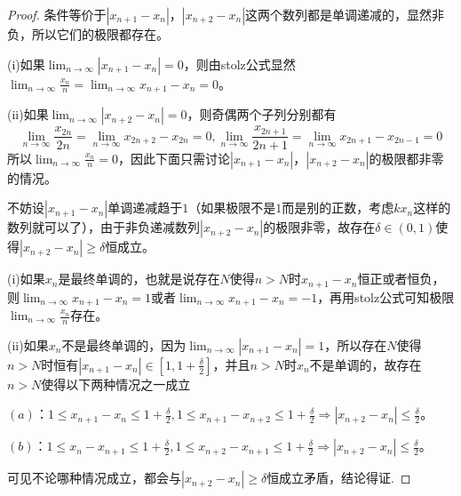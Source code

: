 \documentclass[../../main.tex]{subfiles}%
\begin{document}
\begin{proof}
条件等价于\(|x_{n + 1}-x_n|\)，\(|x_{n + 2}-x_n|\)这两个数列都是单调递减的，显然非负，所以它们的极限都存在。

(i)如果\(\lim_{n\rightarrow\infty}|x_{n + 1}-x_n| = 0\)，则由stolz公式显然\(\lim_{n\rightarrow\infty}\frac{x_n}{n}=\lim_{n\rightarrow\infty}x_{n + 1}-x_n = 0\)。

(ii)如果\(\lim_{n\rightarrow\infty}|x_{n + 2}-x_n| = 0\)，则奇偶两个子列分别都有
\[
\lim_{n\rightarrow\infty}\frac{x_{2n}}{2n}=\lim_{n\rightarrow\infty}x_{2n + 2}-x_{2n}=0, 
\lim_{n\rightarrow\infty}\frac{x_{2n + 1}}{2n + 1}=\lim_{n\rightarrow\infty}x_{2n + 1}-x_{2n - 1}=0
\]
所以\(\lim_{n\rightarrow\infty}\frac{x_n}{n}=0\)，因此下面只需讨论\(|x_{n + 1}-x_n|\)，\(|x_{n + 2}-x_n|\)的极限都非零的情况。

不妨设\(|x_{n + 1}-x_n|\)单调递减趋于\(1\)（如果极限不是\(1\)而是别的正数，考虑\(kx_n\)这样的数列就可以了），由于非负递减数列\(|x_{n + 2}-x_n|\)的极限非零，故存在\(\delta\in(0,1)\)使得\(|x_{n + 2}-x_n|\geqslant \delta\)恒成立。

(i)如果\(x_n\)是最终单调的，也就是说存在\(N\)使得\(n > N\)时\(x_{n + 1}-x_n\)恒正或者恒负，则\(\lim_{n\rightarrow\infty}x_{n + 1}-x_n = 1\)或者\(\lim_{n\rightarrow\infty}x_{n + 1}-x_n=-1\)，再用stolz公式可知极限\(\lim_{n\rightarrow\infty}\frac{x_n}{n}\)存在。

(ii)如果\(x_n\)不是最终单调的，因为\(\lim_{n\rightarrow\infty}|x_{n + 1}-x_n| = 1\)，所以存在\(N\)使得\(n > N\)时恒有\(|x_{n + 1}-x_n|\in\left[1,1+\frac{\delta}{2}\right]\)，并且\(n > N\)时\(x_n\)不是单调的，故存在\(n > N\)使得以下两种情况之一成立

\((a)\)：\(1\leqslant  x_{n + 1}-x_n\leqslant 1+\frac{\delta}{2},1\leqslant  x_{n + 1}-x_{n + 2}\leqslant 1+\frac{\delta}{2}\Rightarrow|x_{n + 2}-x_n|\leqslant \frac{\delta}{2}\)。

\((b)\)：\(1\leqslant  x_n - x_{n + 1}\leqslant 1+\frac{\delta}{2},1\leqslant  x_{n + 2}-x_{n + 1}\leqslant 1+\frac{\delta}{2}\Rightarrow|x_{n + 2}-x_n|\leqslant \frac{\delta}{2}\)。

可见不论哪种情况成立，都会与\(|x_{n + 2}-x_n|\geqslant \delta\)恒成立矛盾，结论得证.
\end{proof}
\end{document}
